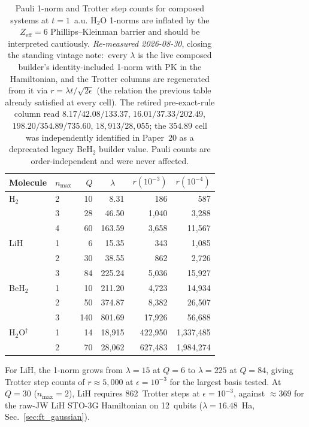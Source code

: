 \documentclass[aps,pra,twocolumn,superscriptaddress,longbibliography]{revtex4-2}
\newcommand{\gvq}[2]{#2}
\begin{document}
\begin{table}[t]
\caption{Pauli 1-norm and Trotter step counts for composed systems at
$t = 1$~a.u.  H$_2$O 1-norms are inflated by the $Z_{\mathrm{eff}} = 6$
Phillips--Kleinman barrier and should be interpreted cautiously.
\emph{Re-measured 2026-08-30}, closing the standing vintage note:\ every
$\lambda$ is the live composed builder's identity-included 1-norm with PK in
the Hamiltonian, and the Trotter columns are regenerated from it via
$r = \lambda t/\sqrt{2\epsilon}$ (the relation the previous table already
satisfied at every cell).  The retired pre-exact-rule column read
$8.17 / 42.08 / 133.37$, $16.01 / 37.33 / 202.49$,
$198.20 / 354.89 / 735.60$, $18{,}913 / 28{,}055$; the $354.89$ cell was
independently identified in Paper~20 as a deprecated legacy BeH$_2$
builder value.  Pauli counts are order-independent and were never affected.}
\label{tab:composed_onenorm}
\begin{ruledtabular}
\begin{tabular}{llrd{3.2}rr}
Molecule & $n_{\max}$ & $Q$ & 
 & $r(10^{-3})$ & $r(10^{-4})$ \\
\hline
H$_2$ & 2 &  10 &     8.31 &        186 &        587 \\
      & 3 &  28 &    46.50 &      1{,}040 &      3{,}288 \\
      & 4 &  60 &   163.59 &      3{,}658 &     11{,}567 \\
\hline
LiH   & 1 &   6 &    15.35 &        343 &      1{,}085 \\
      & 2 &  30 &    38.55 &        862 &      2{,}726 \\
      & 3 &  84 &   225.24 &      5{,}036 &     15{,}927 \\
\hline
BeH$_2$ & 1 &  10 &   211.20 &      4{,}723 &     14{,}934 \\
      & 2 &  50 &   374.87 &      8{,}382 &     26{,}507 \\
      & 3 & 140 &   801.69 &     17{,}926 &     56{,}688 \\
\hline
H$_2$O$^\dagger$ & 1 &  14 & 18{,}915 &  422{,}950 & 1{,}337{,}485 \\
      & 2 &  70 & 28{,}062 &  627{,}483 & 1{,}984{,}274 \\
\end{tabular}
\end{ruledtabular}
\end{table}

For LiH, the 1-norm grows from $\lambda = 15$ at $Q = 6$ to
$\lambda = 225$ at $Q = 84$, giving Trotter step counts of
$r \approx 5{,}000$ at $\epsilon = 10^{-3}$ for the largest basis
tested.  At $Q = 30$ ($n_{\max} = 2$), LiH requires 862~Trotter
steps at $\epsilon = 10^{-3}$, against $\approx 369$ for the raw-JW
LiH STO-3G Hamiltonian on 12~qubits
($\lambda = \gvq{lih_sto3g_lambda}{16.48}$~Ha, Sec.~\ref{sec:ft_gaussian}).
\end{document}
